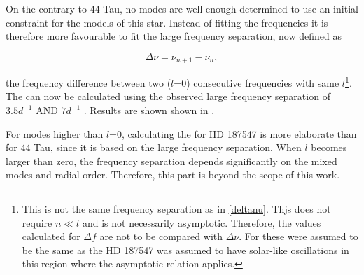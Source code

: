 On the contrary to 44 Tau, no modes are well enough determined to use an initial constraint for the models of this star. Instead of fitting the frequencies it is therefore more favourable to fit the large frequency separation, now defined as

\begin{equation}
    \Delta\nu = \nu_{n+1} - \nu_{n},
\end{equation}

\noindent the frequency difference between two ($l$=0) consecutive frequencies with same $l$\footnote{This is not the same frequency separation as in \eqref{deltanu}. Thjs does not require $n \ll l$ and is not necessarily asymptotic. Therefore, the values calculated for $\Delta f$ are not to be compared with $\Delta \nu$. For \citet{antoci2011excitation} these were assumed to be the same as the HD 187547 was assumed to have solar-like oscillations in this region where the asymptotic relation applies.}.  The \chis can now be calculated using the observed large frequency separation of $3.5d^{-1}$ AND $7d^{-1}$ \citep{antoci2014role}. Results are shown shown in .



For modes higher than $l$=0, calculating the \chis for HD 187547 is more elaborate than for 44 Tau, since it is based on the large frequency separation. When $l$ becomes larger than zero, the frequency separation depends significantly on the mixed modes and radial order. Therefore, this part is beyond the scope of this work. 

